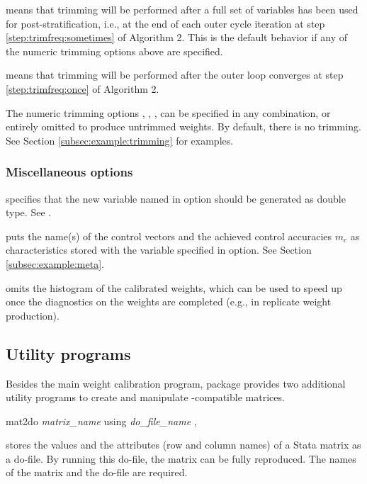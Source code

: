\morehang {} means that trimming will be performed
    after a full set of variables has been used for post-stratification, i.e.,
    at the end of each outer cycle iteration at step \ref{step:trimfreq:sometimes} of
    Algorithm 2. This is the default behavior if any of the numeric trimming
    options above are specified.

\morehang {}
    means that trimming will be performed after the outer loop converges
    at step \ref{step:trimfreq:once} of Algorithm 2.

The numeric trimming options , , 
,  can be specified in any combination,
or entirely omitted to produce untrimmed weights. By default, there is no trimming.
See Section \ref{subsec:example:trimming} for examples.

\subsubsection{Miscellaneous options}

\hangpara
{} specifies that the new variable named in 
option should be generated as double type. See .

\hangpara
{} puts the name(s) of the control vectors and the achieved control
    accuracies $m_c$ as characteristics stored with the variable specified in
     option. See Section \ref{subsec:example:meta}.

\hangpara
{} omits the histogram of the calibrated weights, which can be
used to speed up  once the diagnostics on the weights 
are completed (e.g., in replicate weight production).

\subsection{Utility programs}

Besides the main weight calibration program,  package provides
two additional utility programs to create and manipulate
-compatible matrices.

\begin{stsyntax}
mat2do
{\it matrix\_name}
using
{\it do\_file\_name}
,
\end{stsyntax}

 stores the values and the attributes (row and column names)
of a Stata matrix as a do-file. By running this do-file, the matrix can be fully
reproduced. The names of the matrix and the do-file are required.


